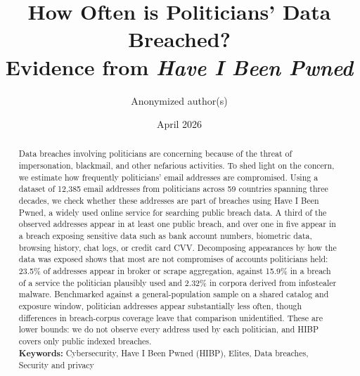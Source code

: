 \documentclass[12pt, letterpaper]{article}
\title{How Often is Politicians' Data Breached?\\Evidence from \textit{Have I Been Pwned}%
}
\author{
Anonymized author(s)
}
\date{April 2026}
\newcommand{\detailtexcount}[1]{%
  \immediate\write18{texcount -merge -sum -q #1.tex output.bbl > #1.wcdetail }%
}
\begin{document}
\maketitle

\thispagestyle{empty}
\begin{abstract}
\noindent Data breaches involving politicians are concerning because of the threat of impersonation, blackmail, and other nefarious activities. To shed light on the concern, we estimate how frequently politicians' email addresses are compromised. Using a dataset of 12,385 email addresses from politicians across 59 countries spanning three decades, we check whether these addresses are part of breaches using Have I Been Pwned, a widely used online service for searching public breach data. A third of the observed addresses appear in at least one public breach, and over one in five appear in a breach exposing sensitive data such as bank account numbers, biometric data, browsing history, chat logs, or credit card CVV. Decomposing appearances by how the data was exposed shows that most are not compromises of accounts politicians held: 23.5\% of addresses appear in broker or scrape aggregation, against 15.9\% in a breach of a service the politician plausibly used and 2.32\% in corpora derived from infostealer malware. Benchmarked against a general-population sample on a shared catalog and exposure window, politician addresses appear substantially less often, though differences in breach-corpus coverage leave that comparison unidentified. These are lower bounds: we do not observe every address used by each politician, and HIBP covers only public indexed breaches.
\\

\noindent
\textbf{Keywords:} Cybersecurity, Have I Been Pwned (HIBP), Elites, Data breaches, Security and privacy
\end{abstract}


\clearpage
\setcounter{page}{1}
\doublespace
\end{document}
